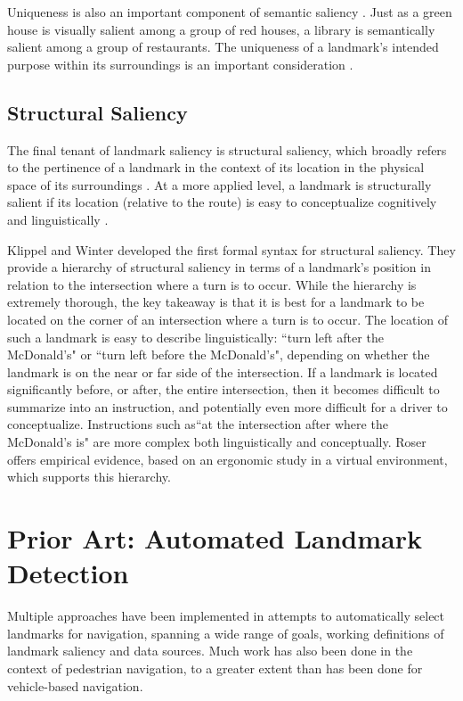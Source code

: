Uniqueness is also an important component of semantic saliency \cite{caduff2008assessment}. Just as a green house is visually salient among a group of red houses, a library is semantically salient among a group of restaurants. The uniqueness of a landmark's intended purpose within its surroundings is an important consideration \cite{caduff2008assessment}.

\subsection{Structural Saliency}
The final tenant of landmark saliency is structural saliency, which broadly refers to the pertinence of a landmark in the context of its location in the physical space of its surroundings \cite{sorrows1999nature}. At a more applied level, a landmark is structurally salient if its location (relative to the route) is easy to conceptualize cognitively and linguistically \cite{klippel2005structural}. 

Klippel and Winter \cite{klippel2005structural} developed the first formal syntax for structural saliency. They provide a hierarchy of structural saliency in terms of a landmark's position in relation to the intersection where a turn is to occur. While the hierarchy is extremely thorough, the key takeaway is that it is best for a landmark to be located on the corner of an intersection where a turn is to occur. The location of such a landmark is easy to describe linguistically: ``turn left after the McDonald's" or ``turn left before the McDonald's", depending on whether the landmark is on the near or far side of the intersection. If a landmark is located significantly before, or after, the entire intersection, then it becomes difficult to summarize into an instruction, and potentially even more difficult for a driver to conceptualize. Instructions such as``at the intersection after where the McDonald's is" are more complex both linguistically and conceptually. Roser \cite{roser2012structural} offers empirical evidence, based on an ergonomic study in a virtual environment, which supports this hierarchy.

\section{Prior Art: Automated Landmark Detection}\label{Sect:eqns}
Multiple approaches have been implemented in attempts to automatically select landmarks for navigation, spanning a wide range of goals, working definitions of landmark saliency and data sources. Much work has also been done in the context of pedestrian navigation, to a greater extent than has been done for vehicle-based navigation.

